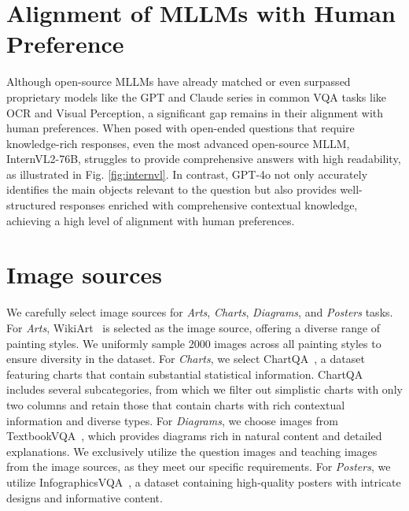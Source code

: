 \newpage
\newpage
\newpage
\appendix

\section{Alignment of MLLMs with Human Preference}
\label{appd: align}
Although open-source MLLMs have already matched or even surpassed proprietary models like the GPT and Claude series in common VQA tasks like OCR and Visual Perception, a significant gap remains in their alignment with human preferences. When posed with open-ended questions that require knowledge-rich responses, even the most advanced open-source MLLM, InternVL2-76B, struggles to provide comprehensive answers with high readability, as illustrated in Fig. \ref{fig:internvl}. In contrast, GPT-4o not only accurately identifies the main objects relevant to the question but also provides well-structured responses enriched with comprehensive contextual knowledge, achieving a high level of alignment with human preferences.

\section{Image sources}
\label{sources}
We carefully select image sources for \textit{Arts}, \textit{Charts}, \textit{Diagrams}, and \textit{Posters} tasks.
For \textit{Arts}, WikiArt~\cite{wikiart} is selected as the image source, offering a diverse range of painting styles. We uniformly sample 2000 images across all painting styles to ensure diversity in the dataset.
For \textit{Charts}, we select ChartQA~\cite{masry2022chartqa}, a dataset featuring charts that contain substantial statistical information. ChartQA includes several subcategories, from which we filter out simplistic charts with only two columns and retain those that contain charts with rich contextual information and diverse types.
For \textit{Diagrams}, we choose images from TextbookVQA~\cite{wikiart}, which provides diagrams rich in natural content and detailed explanations. We exclusively utilize the question images and teaching images from the image sources, as they meet our specific requirements.
For \textit{Posters}, we utilize InfographicsVQA~\cite{mathew2022infographicvqa}, a dataset containing high-quality posters with intricate designs and informative content.  


